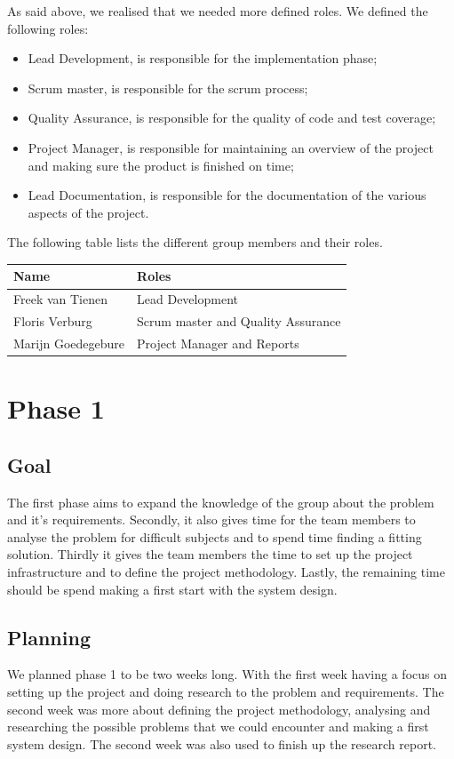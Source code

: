 As said above, we realised that we needed more defined roles.
We defined the following roles:
\begin{itemize}
\item Lead Development, is responsible for the implementation phase;
\item Scrum master, is responsible for the scrum process;
\item Quality Assurance, is responsible for the quality of code and test coverage;
\item Project Manager, is responsible for maintaining an overview of the project and making sure the product is finished on time;
\item Lead Documentation, is responsible for the documentation of the various aspects of the project.
\end{itemize}

The following table lists the different group members and their roles.\\
\begin{tabular}{|l|l|}
\hline
Name & Roles\\
\hline
Freek van Tienen & Lead Development\\
\hline
Floris Verburg & Scrum master and Quality Assurance\\
\hline
Marijn Goedegebure & Project Manager and Reports\\
\hline
\end{tabular}

\section{Phase 1}
\subsection{Goal}
The first phase aims to expand the knowledge of the group about the problem and it's requirements.
Secondly, it also gives time for the team members to analyse the problem for difficult subjects and to spend time finding a fitting solution.
Thirdly it gives the team members the time to set up the project infrastructure and to define the project methodology.
Lastly, the remaining time should be spend making a first start with the system design.

\subsection{Planning}
We planned phase 1 to be two weeks long.
With the first week having a focus on setting up the project and doing research to the problem and requirements.
The second week was more about defining the project methodology, analysing and researching the possible problems that we could encounter and making a first system design.
The second week was also used to finish up the research report.

